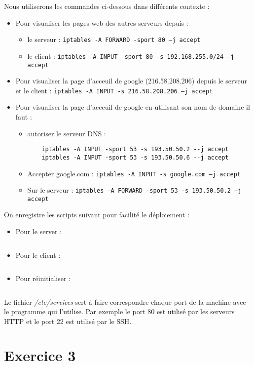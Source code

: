 Nous utiliserons les commandes ci-dessous dans différents contexte :
\begin{itemize}
  \item Pour visualiser les pages web des autres serveurs depuis :
  \begin{itemize}
    \item le serveur : \texttt{iptables -A FORWARD -sport 80 --j accept}
    \item le client : \texttt{iptables -A INPUT -sport 80 -s 192.168.255.0/24 --j accept}
  \end{itemize}
  \item Pour visualiser la page d'acceuil de google (216.58.208.206) depuis le serveur et le client : \texttt{iptables -A INPUT -s 216.58.208.206 --j accept}
  \item Pour visualiser la page d'acceuil de google en utilisant son nom de domaine il faut :
  \begin{itemize}
    \item autoriser le serveur DNS :
    \begin{verbatim}
    iptables -A INPUT -sport 53 -s 193.50.50.2 --j accept
    iptables -A INPUT -sport 53 -s 193.50.50.6 --j accept
    \end{verbatim}
    \item Accepter google.com : \texttt{iptables -A INPUT -s google.com --j accept}
    \item Sur le serveur : \texttt{iptables -A FORWARD -sport 53 -s 193.50.50.2 --j accept}
  \end{itemize}
\end{itemize}

On enregistre les scripts suivant pour facilité le déploiement :
\begin{itemize}
  \item Pour le server :
  \inputminted{bash}{../sources/TP5/tp5-ex2-server.sh}
  \item Pour le client :
  \inputminted{bash}{../sources/TP5/tp5-ex2-client.sh}
  \item Pour réinitialiser :
  \inputminted{bash}{../sources/TP5/tp5-ex2-reset.sh}
\end{itemize}

Le fichier \textit{/etc/services} sert à faire correspondre chaque port de la machine avec le programme qui l'utilise. Par exemple le port 80 est utilisé par les serveurs HTTP et le port 22 est utilisé par le SSH.

\section{Exercice 3}

